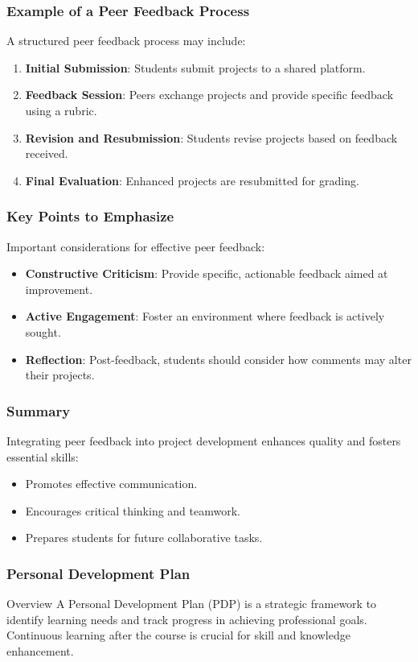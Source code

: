 \documentclass[aspectratio=169]{beamer}
\begin{document}
\begin{frame}[fragile]
    \frametitle{Example of a Peer Feedback Process}
    A structured peer feedback process may include:
    \begin{enumerate}
        \item \textbf{Initial Submission}: Students submit projects to a shared platform.
        \item \textbf{Feedback Session}: Peers exchange projects and provide specific feedback using a rubric.
        \item \textbf{Revision and Resubmission}: Students revise projects based on feedback received.
        \item \textbf{Final Evaluation}: Enhanced projects are resubmitted for grading.
    \end{enumerate}
\end{frame}

\begin{frame}[fragile]
    \frametitle{Key Points to Emphasize}
    Important considerations for effective peer feedback:
    \begin{itemize}
        \item \textbf{Constructive Criticism}: Provide specific, actionable feedback aimed at improvement.
        \item \textbf{Active Engagement}: Foster an environment where feedback is actively sought.
        \item \textbf{Reflection}: Post-feedback, students should consider how comments may alter their projects.
    \end{itemize}
\end{frame}

\begin{frame}[fragile]
    \frametitle{Summary}
    Integrating peer feedback into project development enhances quality and fosters essential skills:
    \begin{itemize}
        \item Promotes effective communication.
        \item Encourages critical thinking and teamwork.
        \item Prepares students for future collaborative tasks.
    \end{itemize}
\end{frame}

\begin{frame}[fragile]
    \frametitle{Personal Development Plan}
    \begin{block}{Overview}
        A Personal Development Plan (PDP) is a strategic framework to identify learning needs and track progress in achieving professional goals. Continuous learning after the course is crucial for skill and knowledge enhancement.
    \end{block}
\end{frame}
\end{document}
